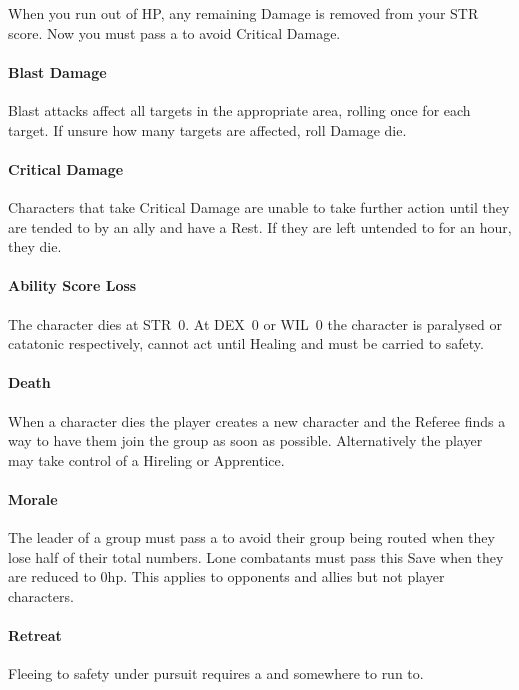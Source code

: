 \documentclass[itdr]{subfiles}
\begin{document}
When you run out of HP, any remaining Damage is removed from your STR score. Now you must pass a  to avoid Critical Damage.

\paragraph{Blast Damage}
Blast attacks affect all targets in the appropriate area, rolling once for each target. If unsure how many targets are affected, roll Damage die.

\paragraph{Critical Damage}
Characters that take Critical Damage are unable to take further action until they are tended to by an ally and have a Rest. If they are left untended to for an hour, they die.

\paragraph{Ability Score Loss}
The character dies at STR~0. At DEX~0 or WIL~0 the character is paralysed or catatonic respectively, cannot act until Healing and must be carried to safety.

\paragraph{Death}
When a character dies the player creates a new character and the Referee finds a way to have them join the group as soon as possible. Alternatively the player may take control of a Hireling or Apprentice.

\paragraph{Morale}
The leader of a group must pass a  to avoid their group being routed when they lose half of their total numbers. Lone combatants must pass this Save when they are reduced to 0hp. This applies to opponents and allies but not player characters.

\paragraph{Retreat}
Fleeing to safety under pursuit requires a  and somewhere to run to.
\end{document}
